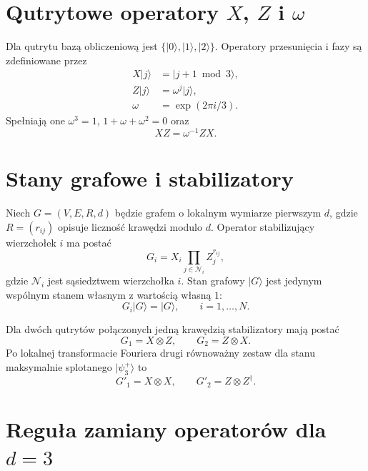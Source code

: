 \documentclass[12pt]{article}
\newcommand{\ket}[1]{\lvert #1\rangle}
\begin{document}
\section{Qutrytowe operatory $X$, $Z$ i $\omega$}

Dla qutrytu baz\k{a} obliczeniow\k{a} jest $\{\ket{0},\ket{1},\ket{2}\}$. Operatory przesuni\k{e}cia
i fazy s\k{a} zdefiniowane przez
\begin{align}
    X\ket{j} &= \ket{j+1 \bmod 3},\\
    Z\ket{j} &= \omega^j\ket{j},\\
    \omega &= \exp(2\pi i/3).
\end{align}
Spe\l{}niaj\k{a} one $\omega^3=1$, $1+\omega+\omega^2=0$ oraz
\begin{equation}
    XZ=\omega^{-1}ZX.
\end{equation}

\section{Stany grafowe i stabilizatory}

Niech $G=(V,E,R,d)$ b\k{e}dzie grafem o lokalnym wymiarze pierwszym $d$, gdzie
$R=(r_{ij})$ opisuje liczno\'s\'c kraw\k{e}dzi modulo $d$. Operator stabilizuj\k{a}cy wierzcho\l{}ek
$i$ ma posta\'c
\begin{equation}
    G_i = X_i\prod_{j\in \mathcal{N}_i} Z_j^{r_{ij}},
\end{equation}
gdzie $\mathcal{N}_i$ jest s\k{a}siedztwem wierzcho\l{}ka $i$. Stan grafowy $\ket{G}$ jest
jedynym wsp\'olnym stanem w\l{}asnym z warto\'sci\k{a} w\l{}asn\k{a} $1$:
\begin{equation}
    G_i\ket{G}=\ket{G}, \qquad i=1,\ldots,N.
\end{equation}

Dla dw\'och qutryt\'ow po\l{}\k{a}czonych jedn\k{a} kraw\k{e}dzi\k{a} stabilizatory maj\k{a} posta\'c
\begin{equation}
    G_1=X\otimes Z,\qquad G_2=Z\otimes X.
\end{equation}
Po lokalnej transformacie Fouriera drugi r\'ownowa\.zny zestaw dla stanu maksymalnie
splotanego $\ket{\psi^+_3}$ to
\begin{equation}
    G'_1=X\otimes X,\qquad G'_2=Z\otimes Z^\dagger.
\end{equation}

\section{Regu\l{}a zamiany operator\'ow dla $d=3$}
\end{document}
